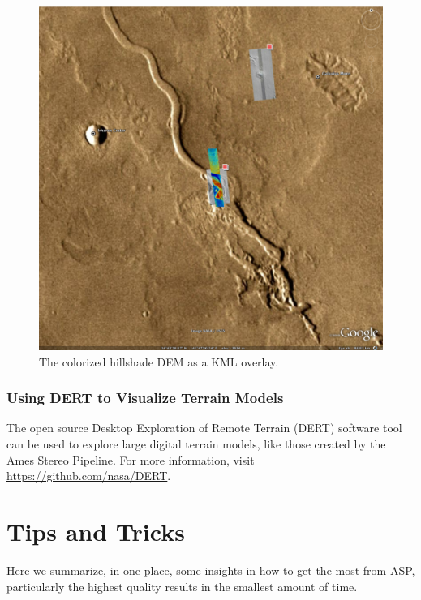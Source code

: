 \begin{figure}[b!]
\begin{center}
\includegraphics[width=6in]{images/p19-googlemars_500px.png}
\caption[Hrad shaded colorized DEM as a KML overlay] {
    \label{hrad-kml}
        The colorized hillshade DEM as a KML overlay.  }
\end{center}
\end{figure}

\subsection{Using DERT to Visualize Terrain Models}

The open source Desktop Exploration of Remote Terrain (DERT) software tool
can be used to explore large digital terrain models, like those created by
the Ames Stereo Pipeline.  For more information, visit \url{https://github.com/nasa/DERT}.


\chapter{Tips and Tricks}
\label{tips}

Here we summarize, in one place, some insights in how to get the most
from ASP, particularly the highest quality results in the smallest
amount of time.

